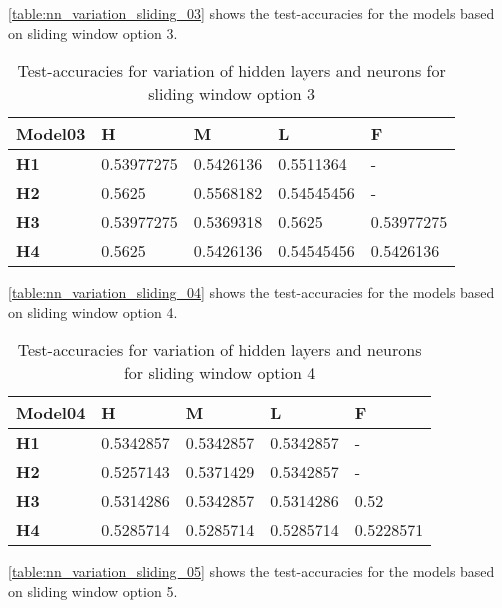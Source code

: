\autoref{table:nn_variation_sliding_03} shows the test-accuracies for the models based on sliding window option 3.

\begin{table}
\centering
\begin{tabular}{|l|l|l|l|l|}
\hline

\textbf{Model03} & \textbf{H} & \textbf{M} & \textbf{L} & \textbf{F} \\ \hline
\textbf{H1} & 0.53977275 & 0.5426136 & 0.5511364 & - \\ \hline
\textbf{H2} & 0.5625 & 0.5568182 & 0.54545456 & - \\ \hline
\textbf{H3} & 0.53977275 & 0.5369318 & 0.5625 & 0.53977275 \\ \hline
\textbf{H4} & 0.5625 & 0.5426136 & 0.54545456 & 0.5426136 \\ \hline

\end{tabular}
\caption{Test-accuracies for variation of hidden layers and neurons for sliding window option 3}
\label{table:nn_variation_sliding_03}
\end{table}

\autoref{table:nn_variation_sliding_04} shows the test-accuracies for the models based on sliding window option 4.

\begin{table}
\centering
\begin{tabular}{|l|l|l|l|l|}
\hline

\textbf{Model04} & \textbf{H} & \textbf{M} & \textbf{L} & \textbf{F} \\ \hline
\textbf{H1} & 0.5342857 & 0.5342857 & 0.5342857 & - \\ \hline
\textbf{H2} & 0.5257143 & 0.5371429 & 0.5342857 & - \\ \hline
\textbf{H3} & 0.5314286 & 0.5342857 & 0.5314286 & 0.52 \\ \hline
\textbf{H4} & 0.5285714 & 0.5285714 & 0.5285714 & 0.5228571 \\ \hline

\end{tabular}
\caption{Test-accuracies for variation of hidden layers and neurons for sliding window option 4}
\label{table:nn_variation_sliding_04}
\end{table}

\autoref{table:nn_variation_sliding_05} shows the test-accuracies for the models based on sliding window option 5.

